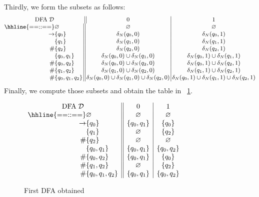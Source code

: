 Thirdly, we form the subsets as follows:
\begin{equation*}
\small
\begin{array}{@{}r@{}l@{\,}||@{\,}c@{\,}|@{\,}c@{}}
\multicolumn{2}{c||}{\text{DFA} \; \mathcal{D}} & 0 & 1\\
\hhline{==::==}
            & \varnothing & \varnothing & \varnothing\\
\rightarrow & \{q_0\} & \delta_N(q_0, 0) & \delta_N(q_0, 1)\\
            & \{q_1\} & \delta_N(q_1, 0) & \delta_N(q_1, 1)\\
         \# & \{q_2\} & \delta_N(q_2, 0) & \delta_N(q_2, 1)\\
            & \{q_0, q_1\} & \delta_N(q_0,0) \cup \delta_N(q_1,0) 
                           & \delta_N(q_0,1) \cup \delta_N(q_1,1)\\
         \# & \{q_0, q_2\} & \delta_N(q_0,0) \cup \delta_N(q_2,0) 
                           & \delta_N(q_0,1) \cup \delta_N(q_2,1)\\
         \# & \{q_1, q_2\} & \delta_N(q_1,0) \cup \delta_N(q_2,0) 
                           & \delta_N(q_1,1) \cup \delta_N(q_2,1)\\
         \# & \{q_0, q_1, q_2\} 
            & \delta_N(q_0,0) \cup \delta_N(q_1,0) \cup \delta_N(q_2,0)
            & \delta_N(q_0,1) \cup \delta_N(q_1,1) \cup \delta_N(q_2,1)
\end{array}
\end{equation*}
Finally, we compute those subsets and obtain the table in
\fig~\ref{fig:first_dfa_table}.
\begin{figure}[t]
\centering
\(\begin{array}{r@{}l||c|c}
\multicolumn{2}{c||}{\text{DFA} \; \mathcal{D}} & 0 & 1\\
\hhline{==::==}
            & \varnothing & \varnothing & \varnothing\\
\rightarrow & \{q_0\} & \{q_0, q_1\} & \{q_0\}\\
            & \{q_1\} & \varnothing & \{q_2\}\\
         \# & \{q_2\} & \varnothing & \varnothing\\
            & \{q_0, q_1\} & \{q_0,q_1\} & \{q_0,q_2\}\\
         \# & \{q_0, q_2\} & \{q_0,q_1\} & \{q_0\}\\
         \# & \{q_1, q_2\} & \varnothing & \{q_2\}\\
         \# & \{q_0, q_1, q_2\} & \{q_0, q_1\} & \{q_0,q_2\}
\end{array}\)
\caption{First DFA obtained\label{fig:first_dfa_table}}
\end{figure}
